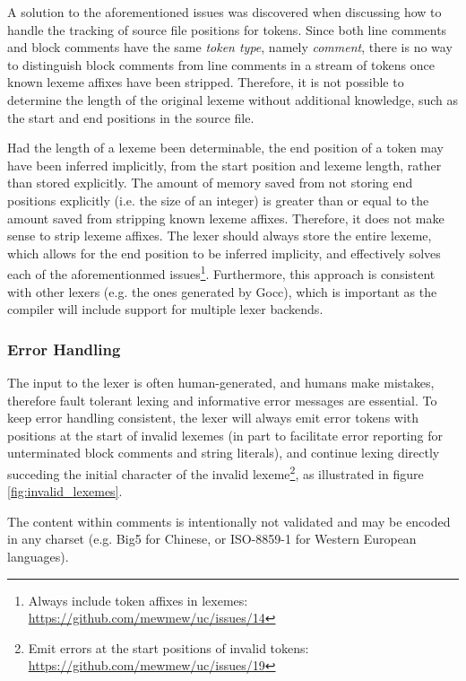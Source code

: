 A solution to the aforementioned issues was discovered when discussing how to handle the tracking of source file positions for tokens. Since both line comments and block comments have the same \textit{token type}, namely \textit{comment}, there is no way to distinguish block comments from line comments in a stream of tokens once known lexeme affixes have been stripped. Therefore, it is not possible to determine the length of the original lexeme without additional knowledge, such as the start and end positions in the source file.

Had the length of a lexeme been determinable, the end position of a token may have been inferred implicitly, from the start position and lexeme length, rather than stored explicitly. The amount of memory saved from not storing end positions explicitly (i.e. the size of an integer) is greater than or equal to the amount saved from stripping known lexeme affixes. Therefore, it does not make sense to strip lexeme affixes. The lexer should always store the entire lexeme, which allows for the end position to be inferred implicity, and effectively solves each of the aforementionmed issues\footnote{Always include token affixes in lexemes: \url{https://github.com/mewmew/uc/issues/14}}. Furthermore, this approach is consistent with other lexers (e.g. the ones generated by Gocc), which is important as the compiler will include support for multiple lexer backends.

\subsubsection{Error Handling}
\label{sec:error_handling}

The input to the lexer is often human-generated, and humans make mistakes, therefore fault tolerant lexing and informative error messages are essential. To keep error handling consistent, the lexer will always emit error tokens with positions at the start of invalid lexemes (in part to facilitate error reporting for unterminated block comments and string literals), and continue lexing directly succeding the initial character of the invalid lexeme\footnote{Emit errors at the start positions of invalid tokens: \url{https://github.com/mewmew/uc/issues/19}}, as illustrated in figure \ref{fig:invalid_lexemes}.

The content within comments is intentionally not validated and may be encoded in any charset (e.g. Big5 for Chinese, or ISO-8859-1 for Western European languages).

